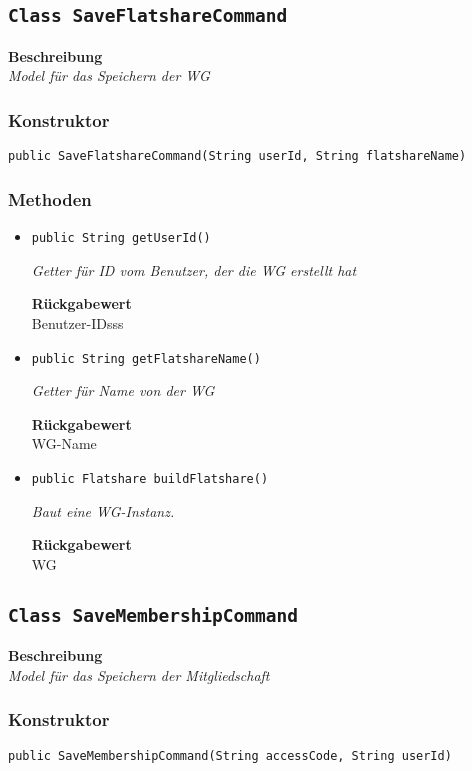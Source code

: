     \subsection{\texttt{Class SaveFlatshareCommand}}
    \textbf{Beschreibung} \\
    \textit{Model für das Speichern der WG}
    \subsubsection{Konstruktor}
    \texttt{public SaveFlatshareCommand(String userId, String flatshareName)}
    \subsubsection{Methoden}
    \begin{itemize}
    	\item{\texttt{public String getUserId()}}
    	
    	\textit{Getter für ID vom Benutzer, der die WG erstellt hat}
    	
    	
    	
    	\textbf{Rückgabewert} \\
    	Benutzer-IDsss        \item{\texttt{public String getFlatshareName()}}
    	
    	\textit{Getter für Name von der WG}
    	
    	
    	
    	\textbf{Rückgabewert} \\
    	WG-Name        \item{\texttt{public Flatshare buildFlatshare()}}
    	
    	\textit{Baut eine WG-Instanz.}
    	
    	
    	
    	\textbf{Rückgabewert} \\
    	WG
    \end{itemize}
    \subsection{\texttt{Class SaveMembershipCommand}}
    \textbf{Beschreibung} \\
    \textit{Model für das Speichern der Mitgliedschaft}
    \subsubsection{Konstruktor}
    \texttt{public SaveMembershipCommand(String accessCode, String userId)}
